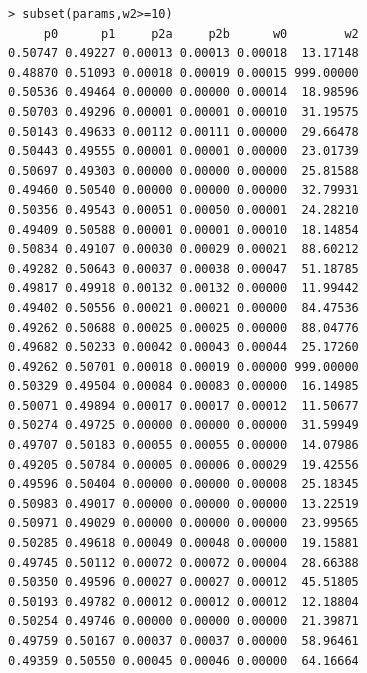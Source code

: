 \documentclass[12pt,letterpaper]{article}\usepackage[]{graphicx}\usepackage[]{color}
\begin{document}
\begin{lstlisting}
> subset(params,w2>=10)
     p0      p1     p2a     p2b      w0        w2
0.50747 0.49227 0.00013 0.00013 0.00018  13.17148
0.48870 0.51093 0.00018 0.00019 0.00015 999.00000
0.50536 0.49464 0.00000 0.00000 0.00014  18.98596
0.50703 0.49296 0.00001 0.00001 0.00010  31.19575
0.50143 0.49633 0.00112 0.00111 0.00000  29.66478
0.50443 0.49555 0.00001 0.00001 0.00000  23.01739
0.50697 0.49303 0.00000 0.00000 0.00000  25.81588
0.49460 0.50540 0.00000 0.00000 0.00000  32.79931
0.50356 0.49543 0.00051 0.00050 0.00001  24.28210
0.49409 0.50588 0.00001 0.00001 0.00010  18.14854
0.50834 0.49107 0.00030 0.00029 0.00021  88.60212
0.49282 0.50643 0.00037 0.00038 0.00047  51.18785
0.49817 0.49918 0.00132 0.00132 0.00000  11.99442
0.49402 0.50556 0.00021 0.00021 0.00000  84.47536
0.49262 0.50688 0.00025 0.00025 0.00000  88.04776
0.49682 0.50233 0.00042 0.00043 0.00044  25.17260
0.49262 0.50701 0.00018 0.00019 0.00000 999.00000
0.50329 0.49504 0.00084 0.00083 0.00000  16.14985
0.50071 0.49894 0.00017 0.00017 0.00012  11.50677
0.50274 0.49725 0.00000 0.00000 0.00000  31.59949
0.49707 0.50183 0.00055 0.00055 0.00000  14.07986
0.49205 0.50784 0.00005 0.00006 0.00029  19.42556
0.49596 0.50404 0.00000 0.00000 0.00008  25.18345
0.50983 0.49017 0.00000 0.00000 0.00000  13.22519
0.50971 0.49029 0.00000 0.00000 0.00000  23.99565
0.50285 0.49618 0.00049 0.00048 0.00000  19.15881
0.49745 0.50112 0.00072 0.00072 0.00004  28.66388
0.50350 0.49596 0.00027 0.00027 0.00012  45.51805
0.50193 0.49782 0.00012 0.00012 0.00012  12.18804
0.50254 0.49746 0.00000 0.00000 0.00000  21.39871
0.49759 0.50167 0.00037 0.00037 0.00000  58.96461
0.49359 0.50550 0.00045 0.00046 0.00000  64.16664
\end{lstlisting}
\end{document}
